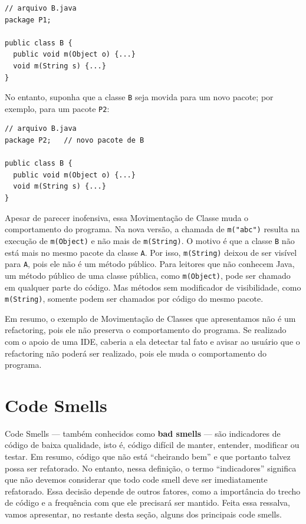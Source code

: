\documentclass[
  11pt,
  twoside]{book}
\newcommand{\passthrough}[1]{#1}
\begin{document}
\begin{lstlisting}
// arquivo B.java
package P1;

public class B {
  public void m(Object o) {...}
  void m(String s) {...}
}
\end{lstlisting}

No entanto, suponha que a classe \passthrough{\lstinline!B!} seja movida
para um novo pacote; por exemplo, para um pacote
\passthrough{\lstinline!P2!}:

\begin{lstlisting}
// arquivo B.java
package P2;   // novo pacote de B

public class B {
  public void m(Object o) {...}
  void m(String s) {...}
} 
\end{lstlisting}

Apesar de parecer inofensiva, essa Movimentação de Classe muda o
comportamento do programa. Na nova versão, a chamada de
\passthrough{\lstinline!m("abc")!} resulta na execução de
\passthrough{\lstinline!m(Object)!} e não mais de
\passthrough{\lstinline!m(String)!}. O motivo é que a classe
\passthrough{\lstinline!B!} não está mais no mesmo pacote da classe
\passthrough{\lstinline!A!}. Por isso,
\passthrough{\lstinline!m(String)!} deixou de ser visível para
\passthrough{\lstinline!A!}, pois ele não é um método público. Para
leitores que não conhecem Java, um método público de uma classe pública,
como \passthrough{\lstinline!m(Object)!}, pode ser chamado em qualquer
parte do código. Mas métodos sem modificador de visibilidade, como
\passthrough{\lstinline!m(String)!}, somente podem ser chamados por
código do mesmo pacote.

Em resumo, o exemplo de Movimentação de Classes que apresentamos não é
um refactoring, pois ele não preserva o comportamento do programa. Se
realizado com o apoio de uma IDE, caberia a ela detectar tal fato e
avisar ao usuário que o refactoring não poderá ser realizado, pois ele
muda o comportamento do programa.

\hypertarget{code-smells}{%
\section{Code Smells}\label{code-smells}}

 

Code Smells --- também conhecidos como \textbf{bad smells} --- são
indicadores de código de baixa qualidade, isto é, código difícil de
manter, entender, modificar ou testar. Em resumo, código que não está
``cheirando bem'' e que portanto talvez possa ser refatorado. No
entanto, nessa definição, o termo ``indicadores'' significa que não
devemos considerar que todo code smell deve ser imediatamente
refatorado. Essa decisão depende de outros fatores, como a importância
do trecho de código e a frequência com que ele precisará ser mantido.
Feita essa ressalva, vamos apresentar, no restante desta seção, alguns
dos principais code smells.
\end{document}
